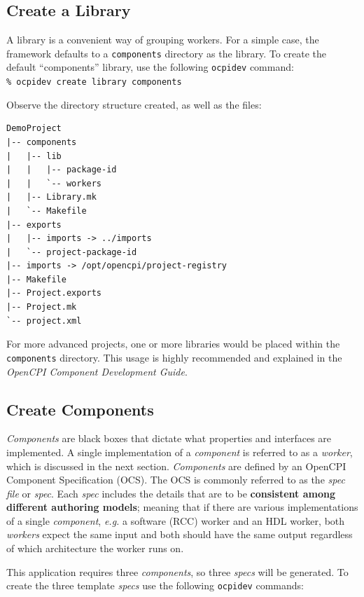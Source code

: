 \subsection{Create a Library}
A library is a convenient way of grouping workers. For a simple case, the framework defaults to a \verb+components+ directory as the library. To create the default ``components'' library, use the following \verb+ocpidev+ command:\\

\forceindent\verb+% ocpidev create library components+\\
\OcpidevCreate{}

\bstart
Observe the directory structure created, as well as the files:
\begin{verbatim}
DemoProject
|-- components
|   |-- lib
|   |   |-- package-id
|   |   `-- workers
|   |-- Library.mk
|   `-- Makefile
|-- exports
|   |-- imports -> ../imports
|   `-- project-package-id
|-- imports -> /opt/opencpi/project-registry
|-- Makefile
|-- Project.exports
|-- Project.mk
`-- project.xml

\end{verbatim}
\bend
For more advanced projects, one or more libraries would be placed within the \verb+components+ directory. This usage is highly recommended and explained in the \textit{OpenCPI Component Development Guide}.

\subsection{Create Components}
\textit{Components} are black boxes that dictate what properties and interfaces are implemented. A single implementation of a \textit{component} is referred to as a \textit{worker}, which is discussed in the next section. \textit{Components} are defined by an OpenCPI Component Specification (OCS). The OCS is commonly referred to as the \textit{spec file} or \textit{spec}. Each \textit{spec} includes the details that are to be \textbf{consistent among different authoring models}; meaning that if there are various implementations of a single \textit{component}, \textit{e.g.} a software (RCC) worker and an HDL worker, both \textit{workers} expect the same input and both should have the same output regardless of which architecture the worker runs on.\newline

This application requires three \textit{components}, so three \textit{specs} will be generated. To create the three template \textit{specs} use the following \verb+ocpidev+ commands:\\

